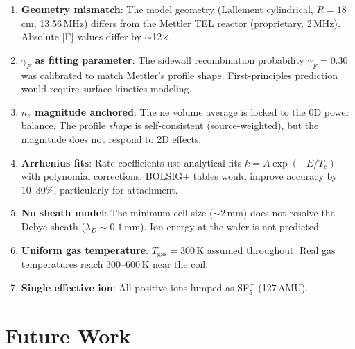 \documentclass[11pt,a4paper]{article}
\renewcommand{\ne}{n_e}
\newcommand{\Te}{T_e}
\begin{document}
\begin{enumerate}
\item \textbf{Geometry mismatch}: The model geometry (Lallement cylindrical, $R=18$\,cm, 13.56\,MHz) differs from the Mettler TEL reactor (proprietary, 2\,MHz).  Absolute [F] values differ by $\sim$12$\times$.

\item \textbf{$\gamma_F$ as fitting parameter}: The sidewall recombination probability $\gamma_F = 0.30$ was calibrated to match Mettler's profile shape.  First-principles prediction would require surface kinetics modeling.

\item \textbf{$\ne$ magnitude anchored}: The ne volume average is locked to the 0D power balance.  The profile \emph{shape} is self-consistent (source-weighted), but the magnitude does not respond to 2D effects.

\item \textbf{Arrhenius fits}: Rate coefficients use analytical fits $k = A\exp(-E/\Te)$ with polynomial corrections.  BOLSIG+ tables would improve accuracy by 10--30\%, particularly for attachment.

\item \textbf{No sheath model}: The minimum cell size ($\sim$2\,mm) does not resolve the Debye sheath ($\lambda_D \sim 0.1$\,mm).  Ion energy at the wafer is not predicted.

\item \textbf{Uniform gas temperature}: $T_{\mathrm{gas}} = 300$\,K assumed throughout.  Real gas temperatures reach 300--600\,K near the coil.

\item \textbf{Single effective ion}: All positive ions lumped as SF$_5^+$ (127\,AMU).
\end{enumerate}

\section{Future Work}
\label{sec:future}
\end{document}
